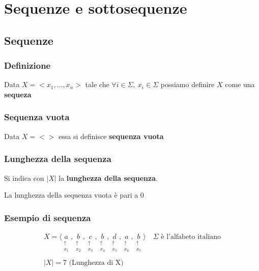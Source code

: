 \chapter{Sequenze e sottosequenze}

    \section{Sequenze}
        \subsection{Definizione}
        Data $X = <x_1, \dots, x_n>$ tale che $\forall i \in \Sigma,\ x_i \in \Sigma$ possiamo definire $X$ come una \textbf{sequeza}

        \subsection{Sequenza vuota}
        Data $X = <>$ essa si definisce \textbf{sequenza vuota}

        \subsection{Lunghezza della sequenza}
        Si indica con $|X|$ la \textbf{lunghezza della sequenza}.

        La lunghezza della sequenza vuota è pari a 0

        \subsection{Esempio di sequenza}
        { 
            \Large

            \begin{gather*}
                X = \langle 
                \underset{\substack{\uparrow \\ x_1}}{a}, 
                \underset{\substack{\uparrow \\ x_2}}{b}, 
                \underset{\substack{\uparrow \\ x_3}}{c}, 
                \underset{\substack{\uparrow \\ x_4}}{b}, 
                \underset{\substack{\uparrow \\ x_5}}{d}, 
                \underset{\substack{\uparrow \\ x_6}}{a}, 
                \underset{\substack{\uparrow \\ x_7}}{b} 
                \rangle \quad \Sigma \text{ è l'alfabeto italiano} \\ \\
                |X| = 7 \text{ (Lunghezza di X)}
            \end{gather*}
        }


